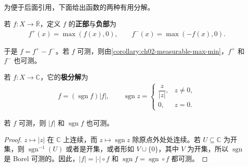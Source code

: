 \documentclass[../../main.tex]{subfiles}%
\begin{document}
为便于后面引用，下面给出函数的两种有用分解。
\begin{definition}[正部与负部]\label{definition:ch02-positive-negative-parts}
若 $f:X\to\overline{\mathbb{R}}$，定义 $f$ 的\textbf{正部}与\textbf{负部}为
\begin{align*}
f^+(x)=\max(f(x),0),\qquad f^-(x)=\max(-f(x),0).
\end{align*}
\end{definition}
\begin{remark}
于是 $f=f^+-f^-$。若 $f$ 可测，则由\cref{corollary:ch02-measurable-max-min}，$f^+$ 和 $f^-$ 也可测。
\end{remark}
\begin{definition}[极分解]\label{definition:ch02-polar-decomposition}
若 $f:X\to\mathbb{C}$，它的\textbf{极分解}为
\begin{align*}
f=(\operatorname{sgn}f)|f|,\qquad
\operatorname{sgn}z=\begin{cases}\dfrac{z}{|z|},&z\ne0,\\0,&z=0.\end{cases}
\end{align*}
\end{definition}
\begin{proposition}\label{proposition:ch02-polar-measurability}
若 $f$ 可测，则 $|f|$ 和 $\operatorname{sgn}f$ 也可测。
\end{proposition}
\begin{proof}
$z\mapsto|z|$ 在 $\mathbb{C}$ 上连续，而 $z\mapsto\operatorname{sgn}z$ 除原点外处处连续。若 $U\subseteq\mathbb{C}$ 为开集，则 $\operatorname{sgn}^{-1}(U)$ 或者是开集，或者形如 $V\cup\{0\}$，其中 $V$ 为开集，所以 $\operatorname{sgn}$ 是 Borel 可测的。因此，$|f|=|\cdot|\circ f$ 和 $\operatorname{sgn}f=\operatorname{sgn}\circ f$ 都可测。
\end{proof}
\end{document}
